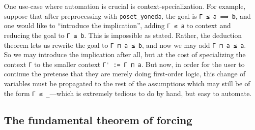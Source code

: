 \documentclass[a4paper,USenglish,cleveref, autoref]{lipics-v2019}
\theoremstyle{theorem}
\theoremstyle{definition}
\begin{document}
One use-case where automation is crucial is context-specialization. For example, suppose that after preprocessing with \lstinline{poset_yoneda}, the goal is \lstinline{Γ ≤ a ⟹ b}, and one would like to ``introduce the implication'', adding \lstinline{Γ ≤ a} to context and reducing the goal to \lstinline{Γ ≤ b}. This is impossible as stated. Rather, the deduction theorem lets us rewrite the goal to \lstinline{Γ ⊓ a ≤ b}, and now we may add \lstinline{Γ ⊓ a ≤ a}. So we may introduce the implication after all, but at the cost of specializing the context \lstinline{Γ} to the smaller context \lstinline{Γ' := Γ ⊓ a}. But now, in order for the user to continue the pretense that they are merely doing first-order logic, this change of variables must be propagated to the rest of the assumptions which may still be of the form \lstinline{Γ ≤ _}---which is extremely tedious to do by hand, but easy to automate.


\subsection{The fundamental theorem of forcing}
\end{document}
